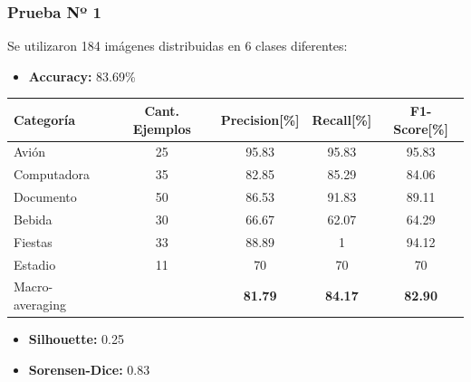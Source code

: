 \begin{frame}[t,fragile]
\frametitle {Prueba Nº 1}
Se utilizaron 184 imágenes distribuidas en 6 clases diferentes:
\begin{itemize}
	\item \textbf{\color{darkgreen}Accuracy:} 83.69\%
\end{itemize}
\begin{table}[t]
	\begin{center}
		\label{tab:prueba1}
		\begin{adjustbox}{max width=\textwidth}
			\begin{tabular}{l|c|c|c|c}
				\textbf{Categoría} & \textbf{Cant. Ejemplos} & \textbf{Precision[\%]} & \textbf{Recall[\%]} & \textbf{F1-Score[\%]} \\
				\hline
				Avión & 25 & 95.83 & 95.83 & 95.83\\
				
				Computadora & 35 & 82.85 & 85.29 & 84.06\\
				
				Documento & 50 & 86.53 & 91.83 & 89.11\\
				
				Bebida & 30 & 66.67 & 62.07 & 64.29\\
				
				Fiestas & 33 & 88.89 & 1 & 94.12\\
				
				Estadio & 11 & 70 & 70 & 70\\
				
				Macro-averaging &  & \textbf{81.79} & \textbf{84.17} & \textbf{82.90}\\
				\hline	
			\end{tabular}
		\end{adjustbox}
	\end{center}
\end{table}
\begin{itemize}
	\item \textbf{\color{blue}Silhouette:} 0.25
	\item \textbf{\color{blue}Sorensen-Dice:} 0.83
\end{itemize}
\end{frame}
